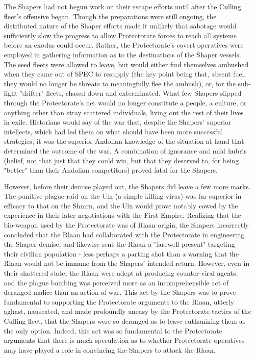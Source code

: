 The Shapers had not begun work on their escape efforts until after the
Culling fleet's offensive began. Though the preparations were still
ongoing, the distributed nature of the Shaper efforts made it unlikely
that sabotage would sufficiently slow the progress to allow
Protectorate forces to reach all systems before an exodus could
occur. Rather, the Protectorate's covert operatives were employed in
gathering information as to the destinations of the Shaper
vessels. The seed fleets were allowed to leave, but would either find
themselves ambushed when they came out of SPEC to resupply (the key
point being that, absent fuel, they would no longer be threats to
meaningfully flee the ambush), or, for the sub-light "drifter" fleets,
chased down and exterminated. What few Shapers slipped through the
Protectorate's net would no longer constitute a people, a culture, or
anything other than stray scattered individuals, living out the rest
of their lives in exile. Historians would say of the war that, despite
the Shapers' superior intellects, which had led them on what should
have been more successful strategies, it was the superior Andolian
knowledge of the situation at hand that determined the outcome of the
war. A combination of ignorance and mild hubris (belief, not that just
that they could win, but that they deserved to, for being "better"
than their Andolian competitors) proved fatal for the Shapers.

However, before their demise played out, the Shapers did leave a few
more marks. The punitive plague-raid on the Uln (a simple killing
virus) was far superior in efficacy to that on the Shmrn, and the Uln
would prove notably cowed by the experience in their later
negotiations with the First Empire. Realizing that the bio-weapon used
by the Protectorate was of Rlaan origin, the Shapers incorrectly
concluded that the Rlaan had collaborated with the Protectorate in
engineering the Shaper demise, and likewise sent the Rlaan a "farewell
present" targeting their civilian population - less perhaps a parting
shot than a warning that the Rlaan would not be immune from the
Shapers' intended return. However, even in their shattered state, the
Rlaan were adept at producing counter-viral agents, and the plague
bombing was perceived more as an incomprehensible act of deranged
malice than an action of war. This act by the Shapers was to prove
fundamental to supporting the Protectorate arguments to the Rlaan,
utterly aghast, nauseated, and made profoundly uneasy by the
Protectorate tactics of the Culling fleet, that the Shapers were so
deranged as to leave euthanizing them as the only option. Indeed, this
act was so fundamental to the Protectorate arguments that there is
much speculation as to whether Protectorate operatives may have played
a role in convincing the Shapers to attack the Rlaan.

